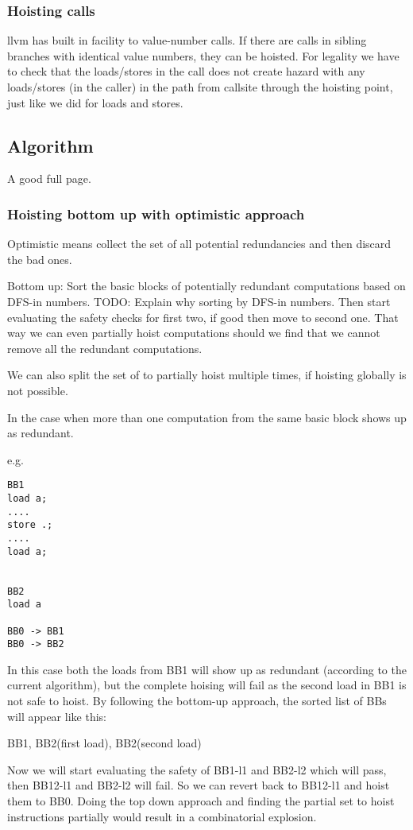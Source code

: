 \documentclass{sig-alternate}
\begin{document}
\subsubsection{Hoisting calls}
llvm has built in facility to value-number calls. If there are calls in sibling
branches with identical value numbers, they can be hoisted. For legality we have
to check that the loads/stores in the call does not create hazard with any
loads/stores (in the caller) in the path from callsite through the hoisting
point, just like we did for loads and stores.

\subsection{Algorithm}
A good full page.

\subsubsection{Hoisting bottom up with optimistic approach}
Optimistic means collect the set of all potential redundancies and
then discard the bad ones.

Bottom up: Sort the basic blocks of potentially redundant computations
based on DFS-in numbers.  TODO: Explain why sorting by DFS-in numbers.
Then start evaluating the safety checks for first two, if good then
move to second one. That way we can even partially hoist computations
should we find that we cannot remove all the redundant computations.

We can also split the set of to partially hoist multiple times, if
hoisting globally is not possible.

In the case when more than one computation from the same basic block
shows up as redundant.

e.g.
\begin{verbatim}
BB1
load a;
....
store .;
....
load a;


BB2
load a

BB0 -> BB1
BB0 -> BB2
\end{verbatim}

In this case both the loads from BB1 will show up as redundant
(according to the current algorithm), but the complete hoising will
fail as the second load in BB1 is not safe to hoist. By following the
bottom-up approach, the sorted list of BBs will appear like this:

{ BB1, BB2(first load), BB2(second load) }

Now we will start evaluating the safety of BB1-l1 and BB2-l2 which
will pass, then BB12-l1 and BB2-l2 will fail.  So we can revert back
to BB12-l1 and hoist them to BB0. Doing the top down approach and
finding the partial set to hoist instructions partially would result
in a combinatorial explosion.
\end{document}
